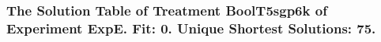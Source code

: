  \begin{frame}
 \fontsize{8pt}{9pt}\selectfont
 \frametitle{ The Solution Table of Treatment BoolT5sgp6k of Experiment ExpE. Fit: 0. Unique Shortest Solutions: 75. }

 \label{ExpESolutionTable009.tex}  
 \end{frame}

